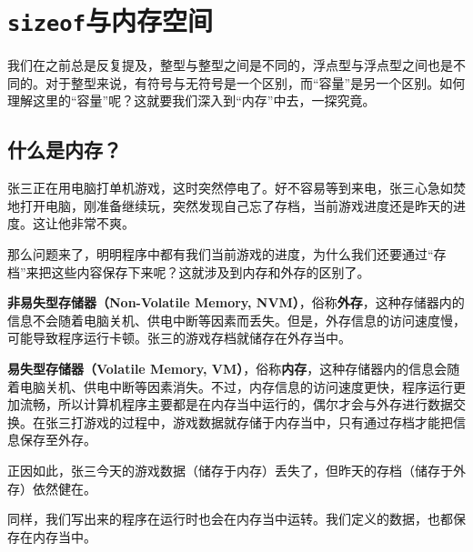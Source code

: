 \section{\texttt{sizeof}与内存空间}
我们在之前总是反复提及，整型与整型之间是不同的，浮点型与浮点型之间也是不同的。对于整型来说，有符号与无符号是一个区别，而``容量''是另一个区别。如何理解这里的``容量''呢？这就要我们深入到``内存''中去，一探究竟。\par
\subsection*{什么是内存？}
张三正在用电脑打单机游戏，这时突然停电了。好不容易等到来电，张三心急如焚地打开电脑，刚准备继续玩，突然发现自己忘了存档，当前游戏进度还是昨天的进度。这让他非常不爽。\par
那么问题来了，明明程序中都有我们当前游戏的进度，为什么我们还要通过``存档''来把这些内容保存下来呢？这就涉及到内存和外存的区别了。\par
\textbf{非易失型存储器（Non-Volatile Memory, NVM）}，俗称\textbf{外存}，这种存储器内的信息不会随着电脑关机、供电中断等因素而丢失。但是，外存信息的访问速度慢，可能导致程序运行卡顿。张三的游戏存档就储存在外存当中。\par
\textbf{易失型存储器（Volatile Memory, VM）}，俗称\textbf{内存}，这种存储器内的信息会随着电脑关机、供电中断等因素消失。不过，内存信息的访问速度更快，程序运行更加流畅，所以计算机程序主要都是在内存当中运行的，偶尔才会与外存进行数据交换。在张三打游戏的过程中，游戏数据就存储于内存当中，只有通过存档才能把信息保存至外存。\par
正因如此，张三今天的游戏数据（储存于内存）丢失了，但昨天的存档（储存于外存）依然健在。\par
同样，我们写出来的程序在运行时也会在内存当中运转。我们定义的数据，也都保存在内存当中。\par
